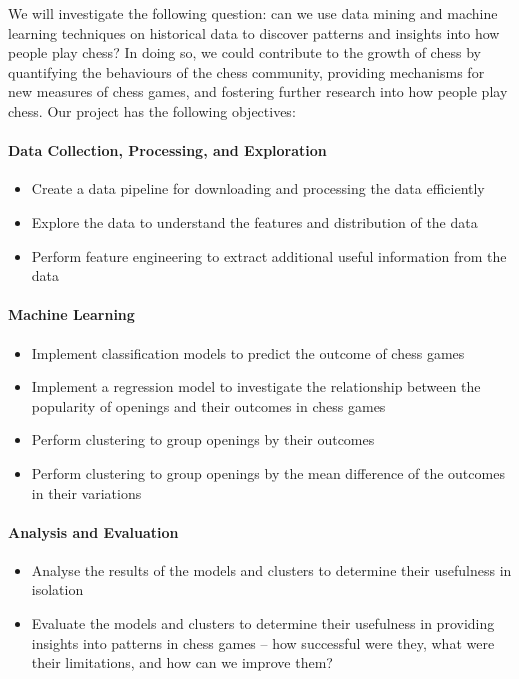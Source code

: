 \documentclass[a4paper, 11pt]{article}
\begin{document}
We will investigate the following question: can we use data mining and machine learning techniques on historical data to discover patterns and insights into how people play chess? In doing so, we could contribute to the growth of chess by quantifying the behaviours of the chess community, providing mechanisms for new measures of chess games, and fostering further research into how people play chess. Our project has the following objectives:

\paragraph{Data Collection, Processing, and Exploration}
\begin{itemize}
    \setlength\itemsep{0em}
    \item Create a data pipeline for downloading and processing the data efficiently
    \item Explore the data to understand the features and distribution of the data
    \item Perform feature engineering to extract additional useful information from the data
\end{itemize}
\paragraph{Machine Learning}
\begin{itemize}
    \setlength\itemsep{0em}
    \item Implement classification models to predict the outcome of chess games
    \item Implement a regression model to investigate the relationship between the popularity of openings and their outcomes in chess games
    \item Perform clustering to group openings by their outcomes
    \item Perform clustering to group openings by the mean difference of the outcomes in their variations
\end{itemize}
\paragraph{Analysis and Evaluation}
\begin{itemize}
    \setlength\itemsep{0em}
    \item Analyse the results of the models and clusters to determine their usefulness in isolation
    \item Evaluate the models and clusters to determine their usefulness in providing insights into patterns in chess games -- how successful were they, what were their limitations, and how can we improve them?
\end{itemize}
\end{document}
